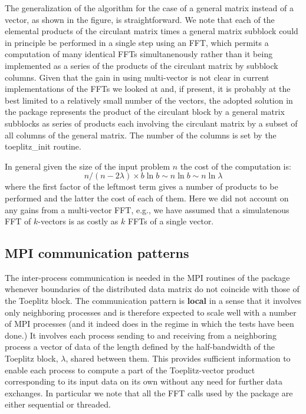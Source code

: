 The generalization of the algorithm for the case of a general matrix instead of a vector, as shown in the figure, is straightforward. We note that each of the elemental products of the circulant matrix times a general matrix subblock could in principle be performed in a single step using an F\-F\-T, which permits a computation of many identical F\-F\-Ts simultanenously rather than it being implemented as a series of the products of the circulant matrix by subblock columns. Given that the gain in using multi-\/vector is not clear in current implementations of the F\-F\-Ts we looked at and, if present, it is probably at the best limited to a relatively small number of the vectors, the adopted solution in the package represents the product of the circulant block by a general matrix subblocks as series of products each involving the circulant matrix by a subset of all columns of the general matrix. The number of the columns is set by the {\ttfamily toeplitz\-\_\-init} routine.

In general given the size of the input problem $n$ the cost of the computation is\-: \[ n/(n-2\lambda)\times b \ln b \sim n \ln b \sim n \ln \lambda \] where the first factor of the leftmost term gives a number of products to be performed and the latter the cost of each of them. Here we did not account on any gains from a multi-\/vector F\-F\-T, e.\-g., we have assumed that a simulatenous F\-F\-T of $k$-\/vectors is as costly as $k$ F\-F\-Ts of a single vector. \hypertarget{toeplitz_algo_communication}{}\subsection{M\-P\-I communication patterns}\label{toeplitz_algo_communication}
The inter-\/process communication is needed in the M\-P\-I routines of the package whenever boundaries of the distributed data matrix do not coincide with those of the Toeplitz block. The communication pattern is {\bfseries local} in a sense that it involves only neighboring processes and is therefore expected to scale well with a number of M\-P\-I processes (and it indeed does in the regime in which the tests have been done.) It involves each process sending to and receiving from a neighboring process a vector of data of the length defined by the half-\/bandwidth of the Toeplitz block, $ \lambda$, shared between them. This provides sufficient information to enable each process to compute a part of the Toeplitz-\/vector product corresponding to its input data on its own without any need for further data exchanges. In particular we note that all the F\-F\-T calls used by the package are either sequential or threaded.

